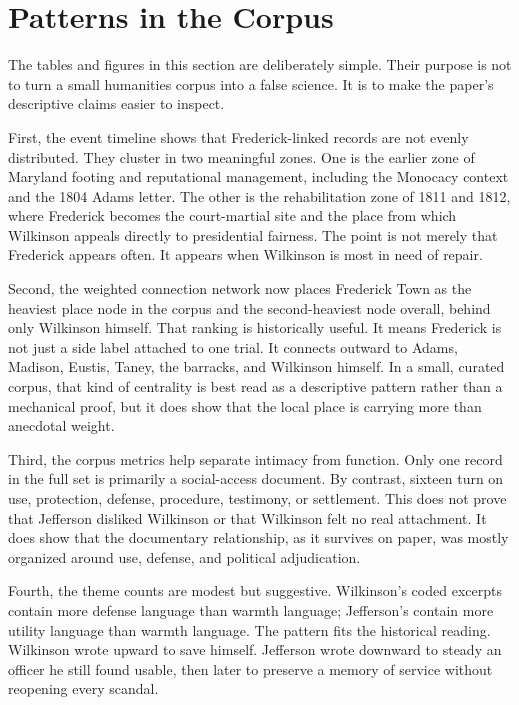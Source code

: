 \section{Patterns in the Corpus}




The tables and figures in this section are deliberately simple. Their purpose is not to turn a small humanities corpus into a false science. It is to make the paper's descriptive claims easier to inspect.

First, the event timeline shows that Frederick-linked records are not evenly distributed. They cluster in two meaningful zones. One is the earlier zone of Maryland footing and reputational management, including the Monocacy context and the 1804 Adams letter. The other is the rehabilitation zone of 1811 and 1812, where Frederick becomes the court-martial site and the place from which Wilkinson appeals directly to presidential fairness. The point is not merely that Frederick appears often. It appears when Wilkinson is most in need of repair.

Second, the weighted connection network now places Frederick Town as the heaviest place node in the corpus and the second-heaviest node overall, behind only Wilkinson himself. That ranking is historically useful. It means Frederick is not just a side label attached to one trial. It connects outward to Adams, Madison, Eustis, Taney, the barracks, and Wilkinson himself. In a small, curated corpus, that kind of centrality is best read as a descriptive pattern rather than a mechanical proof, but it does show that the local place is carrying more than anecdotal weight.

Third, the corpus metrics help separate intimacy from function. Only one record in the full set is primarily a social-access document. By contrast, sixteen turn on use, protection, defense, procedure, testimony, or settlement. This does not prove that Jefferson disliked Wilkinson or that Wilkinson felt no real attachment. It does show that the documentary relationship, as it survives on paper, was mostly organized around use, defense, and political adjudication.

Fourth, the theme counts are modest but suggestive. Wilkinson's coded excerpts contain more defense language than warmth language; Jefferson's contain more utility language than warmth language. The pattern fits the historical reading. Wilkinson wrote upward to save himself. Jefferson wrote downward to steady an officer he still found usable, then later to preserve a memory of service without reopening every scandal.

